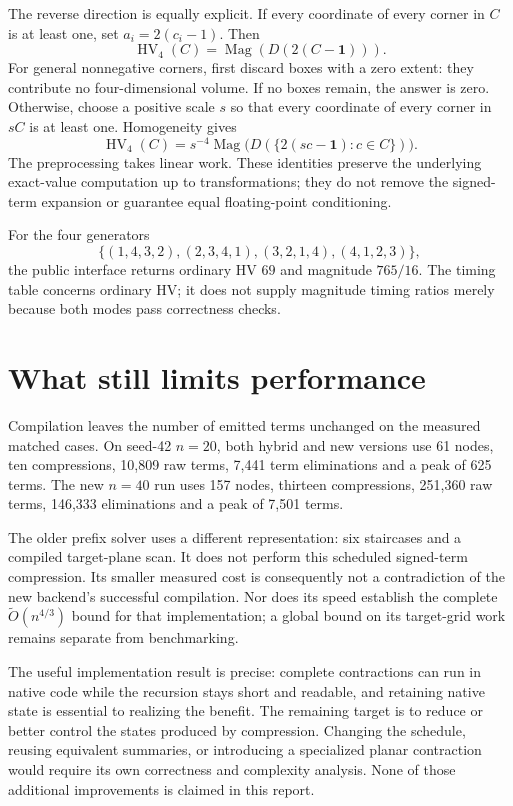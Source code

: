 \documentclass[12pt,a4paper]{article}
\begin{document}
The reverse direction is equally explicit. If every coordinate of every
corner in $C$ is at least one, set $a_i=2(c_i-1)$. Then
\[
 \operatorname{HV}_4(C)=\operatorname{Mag}(D(2(C-\mathbf 1))).
\]
For general nonnegative corners, first discard boxes with a zero extent:
they contribute no four-dimensional volume. If no boxes remain, the answer
is zero. Otherwise, choose a positive scale $s$ so that every coordinate of
every corner in $sC$ is at least one. Homogeneity gives
\[
 \operatorname{HV}_4(C)=s^{-4}
 \operatorname{Mag}\bigl(D(\{2(sc-\mathbf 1):c\in C\})\bigr).
\]
The preprocessing takes linear work. These identities preserve the
underlying exact-value computation up to transformations; they do not remove
the signed-term expansion or guarantee equal floating-point conditioning.

For the four generators
\[
 \{(1,4,3,2),(2,3,4,1),(3,2,1,4),(4,1,2,3)\},
\]
the public interface returns ordinary HV $69$ and magnitude $765/16$.
The timing table concerns ordinary HV; it does not supply magnitude timing
ratios merely because both modes pass correctness checks.

\section{What still limits performance}
Compilation leaves the number of emitted terms unchanged on the measured
matched cases. On seed-42 $n=20$, both hybrid and new versions use 61 nodes,
ten compressions, 10,809 raw terms, 7,441 term eliminations and a peak of 625
terms. The new $n=40$ run uses 157 nodes, thirteen compressions, 251,360 raw
terms, 146,333 eliminations and a peak of 7,501 terms.

The older prefix solver uses a different representation: six staircases and
a compiled target-plane scan. It does not perform this scheduled signed-term
compression. Its smaller measured cost is consequently not a contradiction
of the new backend's successful compilation. Nor does its speed establish
the complete $\widetilde O(n^{4/3})$ bound for that implementation; a global
bound on its target-grid work remains separate from benchmarking.

The useful implementation result is precise: complete contractions can run
in native code while the recursion stays short and readable, and retaining
native state is essential to realizing the benefit. The remaining target
is to reduce or better control the states produced by compression. Changing
the schedule, reusing equivalent summaries, or introducing a specialized
planar contraction would require its own correctness and complexity analysis.
None of those additional improvements is claimed in this report.
\end{document}
